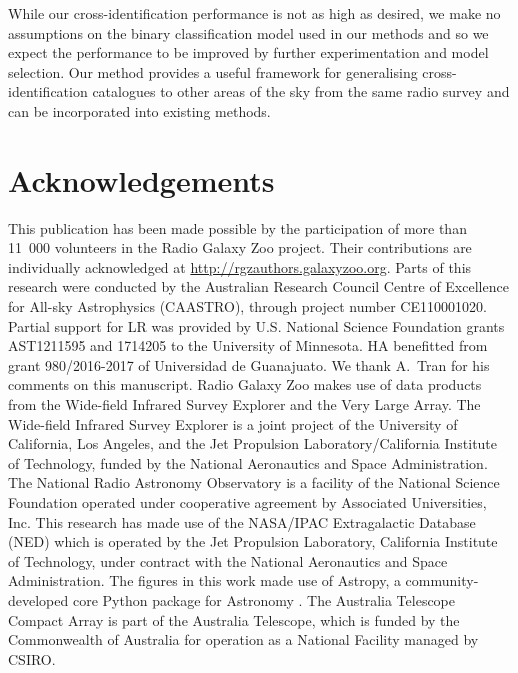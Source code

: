 \documentclass[fleqn,usenatbib,usedcolumn]{mnras}
\begin{document}
  While our cross-identification performance is not as high as desired, we
  make no assumptions on the binary classification model used in our methods
  and so we expect the performance to be improved by further experimentation
  and model selection. Our method provides a useful framework for generalising
  cross-identification catalogues to other areas of the sky from the same radio survey and can be
  incorporated into existing methods.

\section{Acknowledgements}

  This publication has been made possible by the participation of more than 11~000 volunteers in the Radio Galaxy Zoo project. Their contributions are individually acknowledged at \url{http://rgzauthors.galaxyzoo.org}. Parts of this research were conducted by the Australian Research Council Centre of Excellence for All-sky Astrophysics (CAASTRO), through project number CE110001020. Partial support for LR was provided by U.S. National Science Foundation grants AST1211595 and 1714205 to the University of Minnesota. HA benefitted from grant 980/2016-2017 of Universidad de Guanajuato. We thank A.~Tran for his comments on this manuscript. Radio Galaxy Zoo makes use of data products from the Wide-field Infrared Survey Explorer and the Very Large Array. The Wide-field Infrared Survey Explorer is a joint project of the University of California, Los Angeles, and the Jet Propulsion Laboratory/California Institute of Technology, funded by the National Aeronautics and Space Administration. The National Radio Astronomy Observatory is a facility of the National Science Foundation operated under cooperative agreement by Associated Universities, Inc. This research has made use of the NASA/IPAC Extragalactic Database (NED) which is operated by the Jet Propulsion Laboratory, California Institute of Technology, under contract with the National Aeronautics and Space Administration. The figures in this work made use of Astropy, a community-developed core Python package for Astronomy \citep{astropy}. The Australia Telescope Compact Array is part of the Australia Telescope, which is funded by the Commonwealth of Australia for operation as a National Facility managed by CSIRO.

%




\bsp	%
\label{lastpage}
\end{document}
